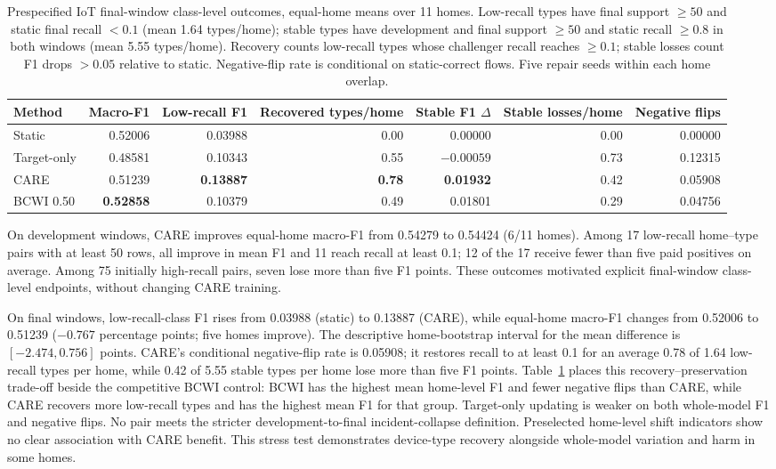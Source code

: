 \documentclass[journal]{IEEEtran}
\begin{document}
\begin{table}[!t]
\centering
\caption{Prespecified IoT final-window class-level outcomes, equal-home means over 11 homes. Low-recall types have final support $\geq50$ and static final recall $<0.1$ (mean 1.64 types/home); stable types have development and final support $\geq50$ and static recall $\geq0.8$ in both windows (mean 5.55 types/home). Recovery counts low-recall types whose challenger recall reaches $\geq0.1$; stable losses count F1 drops $>0.05$ relative to static. Negative-flip rate is conditional on static-correct flows. Five repair seeds within each home overlap.}
\label{tab:iot_class_groups}
\small
\setlength{\tabcolsep}{7pt}
\begin{tabular}{@{}lrrrrrr@{}}
\toprule
Method & Macro-F1 & Low-recall F1 & Recovered types/home & Stable F1 $\Delta$ & Stable losses/home & Negative flips \\
\midrule
Static & 0.52006 & 0.03988 & 0.00 & 0.00000 & 0.00 & 0.00000 \\
Target-only & 0.48581 & 0.10343 & 0.55 & $-0.00059$ & 0.73 & 0.12315 \\
CARE & 0.51239 & \textbf{0.13887} & \textbf{0.78} & \textbf{0.01932} & 0.42 & 0.05908 \\
BCWI 0.50 & \textbf{0.52858} & 0.10379 & 0.49 & 0.01801 & 0.29 & 0.04756 \\
\bottomrule
\end{tabular}
\end{table}

On development windows, CARE improves equal-home macro-F1 from 0.54279 to 0.54424 (6/11 homes). Among 17 low-recall home--type pairs with at least 50 rows, all improve in mean F1 and 11 reach recall at least 0.1; 12 of the 17 receive fewer than five paid positives on average. Among 75 initially high-recall pairs, seven lose more than five F1 points. These outcomes motivated explicit final-window class-level endpoints, without changing CARE training.

On final windows, low-recall-class F1 rises from 0.03988 (static) to 0.13887 (CARE), while equal-home macro-F1 changes from 0.52006 to 0.51239 ($-0.767$ percentage points; five homes improve). The descriptive home-bootstrap interval for the mean difference is $[-2.474,0.756]$ points. CARE's conditional negative-flip rate is 0.05908; it restores recall to at least 0.1 for an average 0.78 of 1.64 low-recall types per home, while 0.42 of 5.55 stable types per home lose more than five F1 points. Table~\ref{tab:iot_class_groups} places this recovery--preservation trade-off beside the competitive BCWI control: BCWI has the highest mean home-level F1 and fewer negative flips than CARE, while CARE recovers more low-recall types and has the highest mean F1 for that group. Target-only updating is weaker on both whole-model F1 and negative flips. No pair meets the stricter development-to-final incident-collapse definition. Preselected home-level shift indicators show no clear association with CARE benefit. This stress test demonstrates device-type recovery alongside whole-model variation and harm in some homes.
\end{document}
